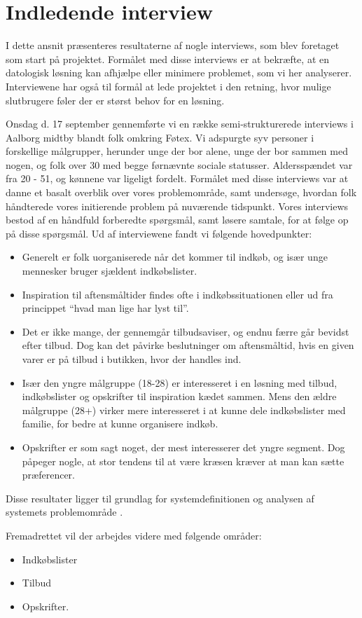 \section{Indledende interview}\label{section:interview1}
I dette ansnit præsenteres resultaterne af nogle interviews, som blev foretaget som start på projektet.
Formålet med disse interviews er at bekræfte, at en datologisk løsning kan afhjælpe eller minimere problemet, som vi her analyserer.
Interviewene har også til formål at lede projektet i den retning, hvor mulige slutbrugere føler der er størst behov for en løsning.


Onsdag d. 17 september gennemførte vi en række semi-strukturerede interviews i Aalborg midtby blandt folk omkring Føtex.
Vi adspurgte syv personer i forskellige målgrupper, herunder unge der bor alene, unge der bor sammen med nogen, og  folk over 30 med begge førnævnte sociale statusser.
Aldersspændet var fra 20 - 51, og kønnene var ligeligt fordelt.
Formålet med disse interviews var at danne et basalt overblik over vores problemområde, samt undersøge, hvordan folk håndterede vores initierende problem på nuværende tidspunkt.
Vores interviews bestod af en håndfuld forberedte spørgsmål, samt løsere samtale, for at følge op på disse spørgsmål.
Ud af interviewene fandt vi følgende hovedpunkter:
\begin{itemize}
	\item Generelt er folk uorganiserede når det kommer til indkøb, og især unge mennesker bruger sjældent indkøbslister.
	\item Inspiration til aftensmåltider findes ofte i indkøbssituationen eller ud fra princippet “hvad man lige har lyst til”.
	\item Det er ikke mange, der gennemgår tilbudsaviser, og endnu færre går bevidst efter tilbud.
	Dog kan det påvirke beslutninger om aftensmåltid, hvis en given varer er på tilbud i butikken, hvor der handles ind.
	\item Især den yngre målgruppe (18-28) er interesseret i en løsning med tilbud, indkøbslister og opskrifter til inspiration kædet sammen. Mens den ældre målgruppe (28+) virker mere interesseret i at kunne dele indkøbslister med familie, for bedre at kunne organisere indkøb.
	\item Opskrifter er som sagt noget, der mest interesserer det yngre segment.
	Dog påpeger nogle, at stor tendens til at være kræsen kræver at man kan sætte præferencer.
\end{itemize}

Disse resultater ligger til grundlag for systemdefinitionen og analysen af systemets problemområde .

Fremadrettet vil der arbejdes videre med følgende områder:

\begin{itemize}
	\item Indkøbslister
	\item Tilbud
	\item Opskrifter.
\end{itemize}
